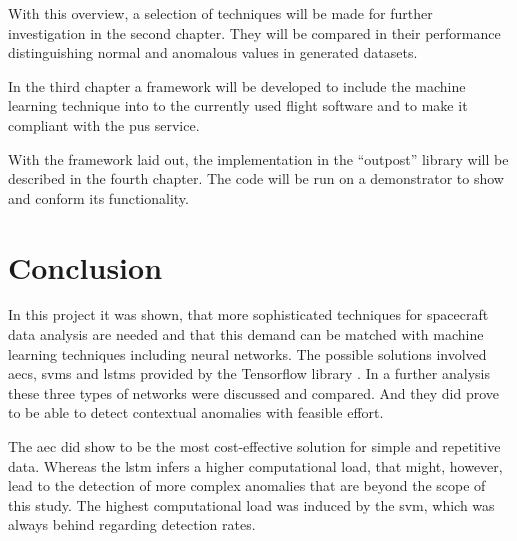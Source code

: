 {{{With this overview, a selection of techniques will be made for further investigation in the second chapter. They will be compared in their performance distinguishing normal and anomalous values in generated datasets. %

In the third chapter a framework will be developed to include the machine learning technique into to the currently used flight software and to make it compliant with the \ac{pus} service. %

With the framework laid out, the implementation in the \enquote{\ac{outpost}} library will be described in the fourth chapter. The code will be run on a demonstrator to show and conform its functionality.










%

\chapter{Conclusion}

In this project it was shown, that more sophisticated techniques for spacecraft data analysis are needed and that this demand can be matched with machine learning techniques including neural networks. The possible solutions involved \acfp{aec}, \acfp{svm} and \acfp{lstm} provided by the Tensorflow library \cite{tf-web}.\newline
In a further analysis these three types of networks were discussed and compared. And they did prove to be able to detect contextual anomalies with feasible effort.

The \ac{aec} did show to be the most cost-effective solution for simple and repetitive data. Whereas the \ac{lstm} infers a higher computational load, that might, however, lead to the detection of more complex anomalies that are beyond the scope of this study. The highest computational load was induced by the \ac{svm}, which was always behind regarding detection rates.

}}}
